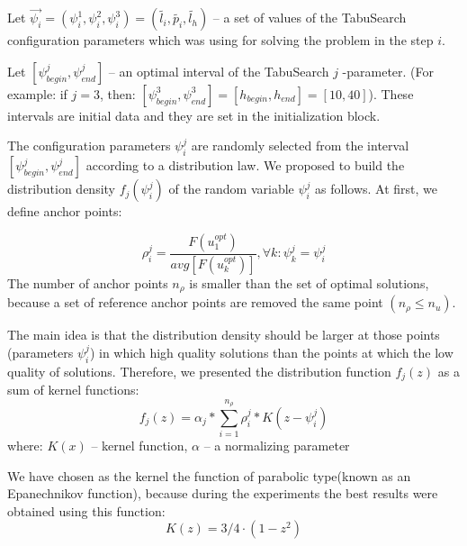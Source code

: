 \documentclass[]{TAACpaper}
\begin{document}
Let $\vec{\psi_i} = (\psi^1_i,\psi^2_i,\psi^3_i) = (\tilde{l_i},\tilde{p_i},\tilde{l_h})$ -- a set of values of the TabuSearch configuration parameters which was using for solving the problem in the step $i$.

Let $[\psi^j_{begin}, \psi^j_{end}]$ -- an optimal interval of the TabuSearch $j$ -parameter. (For example: if $j=3$, then: $[\psi^3_{begin}, \psi^3_{end}]= [h_{begin}, h_{end}] = [10, 40] $). These intervals are initial data and they are set in the initialization block. 

The configuration parameters  $\psi^j_i $ are randomly selected from the interval $[\psi^j_{begin}, \psi^j_{end}]$ according to a distribution law. We proposed to build the distribution density $f_j(\psi^j_i)$ of the random variable $\psi^j_i$ as follows. At first, we define anchor points:
 
 \begin{equation} \label{anchor_points}
     \rho^j_i =  \dfrac{F(u^{opt}_1)}{avg[F(u^{opt}_k)]}, \forall k: \psi^j_k = \psi^j_i
 \end{equation}
 The number of anchor points $n_{\rho}$  is smaller than the set of optimal solutions, because a set of reference anchor points are removed the same point $(n_{\rho} \leq  n_u)$.
 
The main idea is that the distribution density should be larger at those points (parameters $\psi^j_i$) in which high quality solutions than the points at which the low quality of solutions.
Therefore, we presented the distribution function $f_j(z)$ as a sum of kernel functions:
 \begin{equation} \label{dist_density}
 f_j(z) = \alpha_j * \sum\limits_{i=1}^{n_{\rho}}  \rho^j_i * K(z -  \psi^j_i)
 \end{equation}
 where: $K(x)$ -- kernel function, $ \alpha$ -- a normalizing parameter
 
 We have chosen as the kernel the function of parabolic type(known as an Epanechnikov function),  because during the experiments the best results were obtained using this function:
 \begin{equation} \label{dist_density}
  K(z) = 3/4 \cdot (1-z^2)
 \end{equation}
 
\end{document}
